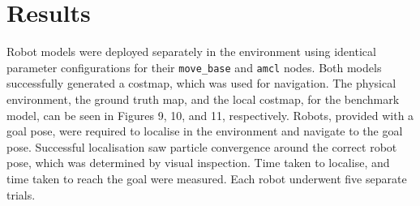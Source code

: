 \documentclass[a4paper]{article}
\begin{document}
\section{Results}
Robot models were deployed separately in the environment using identical parameter configurations for their \texttt{move\_base} and \texttt{amcl} nodes. Both models successfully generated a costmap, which was used for navigation. The physical environment, the ground truth map, and the local costmap, for the benchmark model, can be seen in Figures 9, 10, and 11, respectively. Robots, provided with a goal pose, were required to localise in the environment and navigate to the goal pose. Successful localisation saw particle convergence around the correct robot pose, which was determined by visual inspection. Time taken to localise, and time taken to reach the goal were measured. Each robot underwent five separate trials.\\

\begin{minipage}[t]{0.45\textwidth}
\centering
{}
\end{minipage}
\hspace{1cm}
\begin{minipage}[t]{0.45\textwidth}
\centering
{}
\end{minipage}

\vspace{0.25cm}
\end{document}
